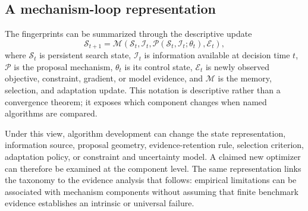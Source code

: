 \subsection{A mechanism-loop representation}

The fingerprints can be summarized through the descriptive update
\begin{equation}
\mathcal{S}_{t+1}=\mathcal{M}\!\left(\mathcal{S}_{t},\mathcal{I}_{t},\mathcal{P}(\mathcal{S}_{t},\mathcal{I}_{t};\theta_t),\mathcal{E}_{t}\right),
\label{eq:mechanism-loop}
\end{equation}
where \(\mathcal{S}_{t}\) is persistent search state, \(\mathcal{I}_{t}\) is information available at decision time \(t\), \(\mathcal{P}\) is the proposal mechanism, \(\theta_t\) is its control state, \(\mathcal{E}_{t}\) is newly observed objective, constraint, gradient, or model evidence, and \(\mathcal{M}\) is the memory, selection, and adaptation update. This notation is descriptive rather than a convergence theorem; it exposes which component changes when named algorithms are compared.

Under this view, algorithm development can change the state representation, information source, proposal geometry, evidence-retention rule, selection criterion, adaptation policy, or constraint and uncertainty model. A claimed new optimizer can therefore be examined at the component level. The same representation links the taxonomy to the evidence analysis that follows: empirical limitations can be associated with mechanism components without assuming that finite benchmark evidence establishes an intrinsic or universal failure.

